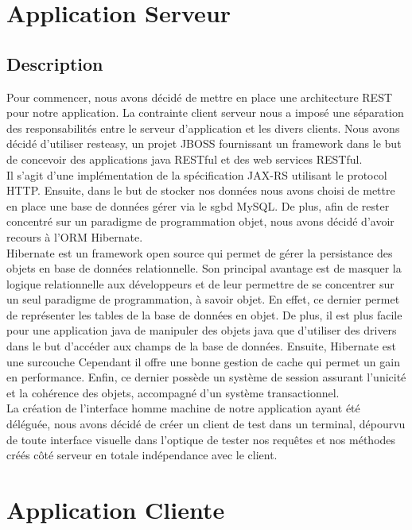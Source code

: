 \newpage
\section{Application Serveur}
\subsection{Description}
Pour commencer, nous avons décidé de mettre en place une architecture REST pour notre application. La contrainte client serveur nous a imposé
une séparation des responsabilités entre le serveur d'application et les divers clients. 
Nous avons décidé d'utiliser resteasy, un projet JBOSS fournissant un framework dans le but de concevoir des applications java RESTful et des web services RESTful.\\
Il s'agit d'une implémentation de la spécification JAX-RS utilisant le protocol HTTP.
Ensuite, dans le but de stocker nos données nous avons choisi de mettre en place une base de données gérer via le sgbd MySQL. De plus, afin de rester concentré
sur un paradigme de programmation objet, nous avons décidé d'avoir recours à l'ORM Hibernate. 
\\
Hibernate est un framework open source qui permet de gérer la persistance des objets en base de données relationnelle.
Son principal avantage est de masquer la logique relationnelle aux développeurs et de leur permettre de se concentrer
sur un seul paradigme de programmation, à savoir objet. En effet, ce dernier permet de représenter les tables de la base 
de données en objet. De plus, il est plus facile pour une application java de manipuler des objets java que d'utiliser
des drivers dans le but d'accéder aux champs de la base de données. Ensuite, Hibernate est une surcouche {\color{red}{qui donc 
un coût en ressource.}} Cependant il offre une bonne gestion de cache qui permet un gain en performance. Enfin, ce dernier
possède un système de session assurant l'unicité et la cohérence des objets, accompagné d'un système transactionnel.
\\
La création de l'interface homme machine de notre application ayant été déléguée, nous avons décidé de créer un client de test dans un terminal, dépourvu de toute interface visuelle dans l'optique de tester nos requêtes et nos méthodes créés côté serveur en totale indépendance avec le client.




\newpage
\section{Application Cliente}
